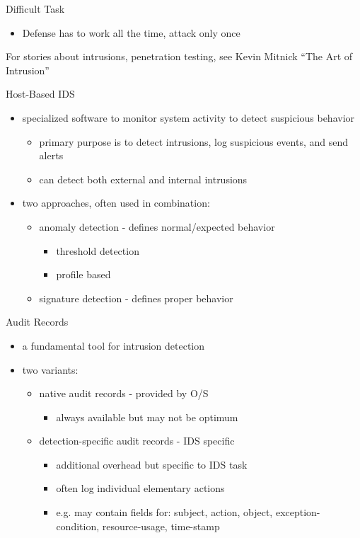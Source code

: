 \documentclass{beamer}
\begin{document}
\begin{frame}{Difficult Task}
  \begin{itemize}
  \item Defense has to work all the time, attack only 
    once
  \end{itemize}
  For stories about intrusions, penetration testing, 
see Kevin Mitnick ``The Art of Intrusion''
\end{frame}

\begin{frame}{Host-Based IDS}
  \begin{itemize}
  \item specialized software to monitor system activity to 
    detect suspicious behavior 
    \begin{itemize}
    \item primary purpose is to detect intrusions, log suspicious events, 
      and send alerts 
    \item can detect both external and internal intrusions 
    \end{itemize}
  \item two approaches, often used in combination: 
    \begin{itemize}
    \item anomaly detection - defines normal/expected behavior 
      \begin{itemize}
      \item threshold detection 
      \item profile based 
      \end{itemize}
    \item signature detection - defines proper behavior
    \end{itemize}
  \end{itemize}
\end{frame}


\begin{frame}{Audit Records}
  \begin{itemize}
  \item a fundamental tool for intrusion detection 
  \item two variants: 
    \begin{itemize}
    \item native audit records - provided by O/S 
      \begin{itemize}
      \item always available but may not be optimum 
      \end{itemize}
    \item detection-specific audit records - IDS specific 
      \begin{itemize}
      \item additional overhead but specific to IDS task 
      \item often log individual elementary actions 
      \item e.g. may contain fields for: subject, action, object, 
        exception-condition, resource-usage, time-stamp
      \end{itemize}
    \end{itemize}
  \end{itemize}
\end{frame}
\end{document}
